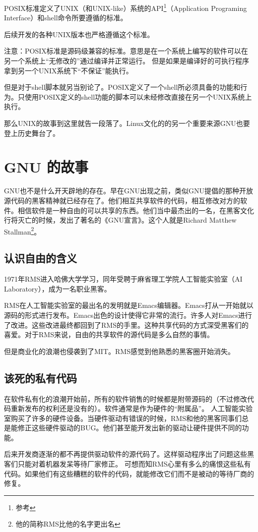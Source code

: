 POSIX标准定义了UNIX（和UNIX-like）系统的API\footnote{ 参考}（Application Programing Interface）和shell命令所要遵循的标准。

后续开发的各种UNIX版本也严格遵循这个标准。

\begin{notice}
注意：POSIX标准是源码级兼容的标准。意思是在一个系统上编写的软件可以在另一个系统上“无修改的”通过编译并正常运行。
但是如果是编译好的可执行程序拿到另一个UNIX系统下“不保证”能执行。

但是对于shell脚本就另当别论了。POSIX定义了一个shell所必须具备的功能和行为。只使用POSIX定义的shell功能的脚本可以未经修改直接在另一个UNIX系统上执行。
\end{notice}

那么UNIX的故事到这里就告一段落了。Linux文化的的另一个重要来源GNU也要登上历史舞台了。

\section{GNU 的故事}

GNU也不是什么开天辟地的存在。早在GNU出现之前，类似GNU提倡的那种开放源代码的黑客精神就已经存在了。他们相互共享软件的代码，相互修改对方的软件。相信软件是一种自由的可以共享的东西。他们当中最杰出的一名，在黑客文化行将灭亡的时候，发出了著名的《GNU宣言》。这个人就是Richard Matthew Stallman\footnote{他的简称RMS比他的名字更出名}。


\subsection{认识自由的含义}

1971年RMS进入哈佛大学学习，同年受聘于麻省理工学院人工智能实验室（AI Laboratory），成为一名职业黑客。

RMS在人工智能实验室的最出名的发明就是Emacs编辑器。Emacs打从一开始就以源码的形式进行发布。Emacs出色的设计使得它非常的流行。许多人对Emacs进行了改进。这些改进最终都回到了RMS的手里。这种共享代码的方式深受黑客们的喜爱。对于RMS来说，自由的共享软件的源代码是多么自然的事情。

但是商业化的浪潮也侵袭到了MIT。RMS感觉到他熟悉的黑客圈开始消失。

\begin{insertnote}
\subsection*{该死的私有代码}
在软件私有化的浪潮开始前，所有的软件销售的时候都是附带源码的（不过修改代码重新发布的权利还是没有的）。软件通常是作为硬件的“附属品”。
人工智能实验室购买了许多的硬件设备。当硬件驱动有错误的时候，RMS和他的黑客同事们总是能修正这些硬件驱动的BUG。他们甚至能开发出新的驱动让硬件提供不同的功能。

后来开发商逐渐的都不再提供驱动软件的源代码了。这样驱动程序出了问题这些黑客们只能对着机器发呆等待厂家修正。
可想而知RMS心里有多么的痛恨这些私有代码。如果他们有这些糟糕的软件的代码，就能修改它们而不是被动的等待厂商的修复。
\end{insertnote}

